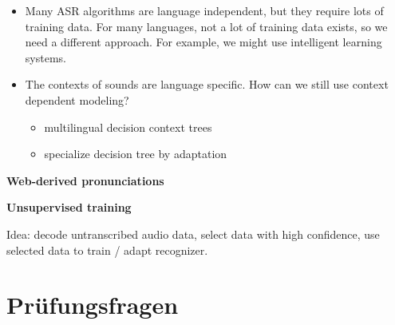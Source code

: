 \begin{itemize}
    \item Many ASR algorithms are language independent, but they require lots of training data. For many languages, not a lot of training data exists, so we need a different approach. For example, we might use intelligent learning systems.
    \item The contexts of sounds are language specific. How can we still use context dependent modeling?
        \begin{itemize}
            \item multilingual decision context trees
            \item specialize decision tree by adaptation
        \end{itemize}
\end{itemize}

\vspace{10pt}
\textbf{Web-derived pronunciations}
\vspace{5pt}

\vspace{10pt}
\textbf{Unsupervised training}
\vspace{5pt}

Idea: decode untranscribed audio data, select data with high confidence, use selected data to train / adapt recognizer.

\newpage
\section{Prüfungsfragen}
